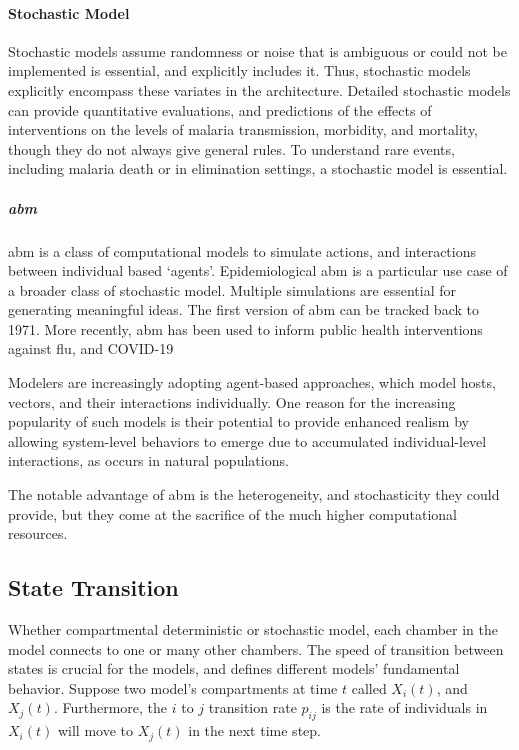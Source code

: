 \documentclass[a4paper, 12pt, twoside]{article}
\begin{document}
\paragraph{Stochastic Model}
\label{par:stochastic_model}
Stochastic models assume randomness or noise that is ambiguous or could not be implemented is essential, and explicitly includes it.
Thus, stochastic models explicitly encompass these variates in the architecture.
Detailed stochastic models can provide quantitative evaluations, and predictions of the effects of interventions on the levels of malaria transmission, morbidity, and mortality, though they do not always give general rules.
To understand rare events, including malaria death or in elimination settings, a stochastic model is essential.

\subparagraph{\gls{abm}}
\gls{abm} is a class of computational models to simulate actions, and interactions between individual based `agents'.
Epidemiological \gls{abm} is a particular use case of a broader class of stochastic model.
Multiple simulations are essential for generating meaningful ideas.
The first version of \gls{abm} can be tracked back to 1971\cite{Schelling1971}.
More recently, \gls{abm} has been used to inform public health interventions against flu\cite{Ferguson2006a, Ferguson2005}, and COVID-19\cite{Maziarz2020, Ferguson2020, Chang2020}

Modelers are increasingly adopting agent-based approaches, which model hosts, vectors, and their interactions individually.
One reason for the increasing popularity of such models is their potential to provide enhanced realism by allowing system-level behaviors to emerge due to accumulated individual-level interactions, as occurs in natural populations.

The notable advantage of \gls{abm} is the heterogeneity, and stochasticity they could provide, but they come at the sacrifice of the much higher computational resources.

\subsection{State Transition}
Whether compartmental deterministic or stochastic model, each chamber in the model connects to one or many other chambers.
The speed of transition between states is crucial for the models, and defines different models’ fundamental behavior.
Suppose two model's compartments at time $t$ called $X_i(t)$, and $X_j(t)$.
Furthermore, the $i$ to  $j$ transition rate  $p_{ij}$ is the rate of individuals in $X_i(t)$ will move to $X_j(t)$ in the next time step.
\end{document}
